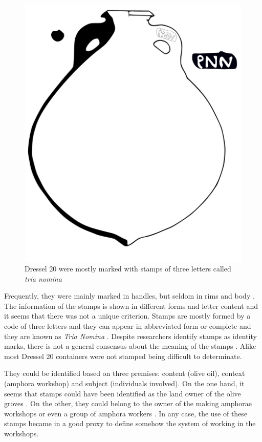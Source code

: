 \documentclass[review]{elsarticle}
\begin{document}
\begin{figure}[htp]
	\centering
\includegraphics[scale=0.5]{figs/dressel20}
\caption{Dressel 20 were mostly marked with stamps of three letters called \textit{tria nomina}}
\label{amphora}
\end{figure} 

Frequently, they were mainly marked  in handles, but seldom in rims and body \citep{millet_anforas_1998}. 
The information of the stamps is shown in different forms and letter content and it seems that there was not a unique criterion. Stamps are mostly formed by a code of three letters and they can appear in abbreviated form or complete and they are known as \textit{Tria Nomina} \citep{berni_millet_amphora_1996}. Despite researchers identify stamps as identity marks, there is not a general consensus about the meaning of the stamps \citep{rodriguez_baetican_1998}. Alike most Dressel 20 containers were not stamped being difficult to determinate. 

They could be identified based on three premises: content (olive oil), context (amphora workshop) and subject (individuals involved). On the one hand, it seems that stamps could have been identified as the land owner of the olive groves \citep{rodriguez_economioleicola_1977}. On the other, they could belong to the owner of the making amphorae workshops or even a group of amphora workers \citep{berni_millet_epigrafianforica_2008}. In any case, the use of these stamps became in a good proxy to define somehow the system of working in the workshops. 
\end{document}
